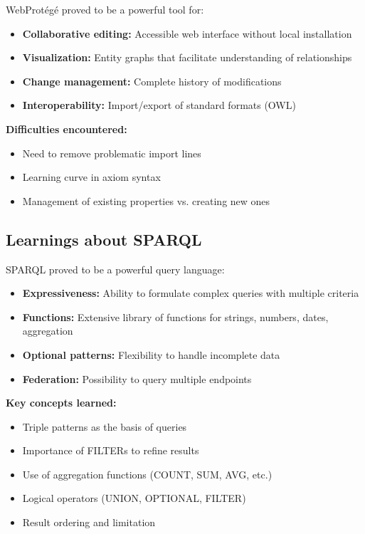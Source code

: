 \documentclass[12pt,a4paper]{article}
\begin{document}
WebProtégé proved to be a powerful tool for:

\begin{itemize}
    \item \textbf{Collaborative editing:} Accessible web interface without local installation
    \item \textbf{Visualization:} Entity graphs that facilitate understanding of relationships
    \item \textbf{Change management:} Complete history of modifications
    \item \textbf{Interoperability:} Import/export of standard formats (OWL)
\end{itemize}

\textbf{Difficulties encountered:}
\begin{itemize}
    \item Need to remove problematic import lines
    \item Learning curve in axiom syntax
    \item Management of existing properties vs. creating new ones
\end{itemize}

\subsection{Learnings about SPARQL}

SPARQL proved to be a powerful query language:

\begin{itemize}
    \item \textbf{Expressiveness:} Ability to formulate complex queries with multiple criteria
    \item \textbf{Functions:} Extensive library of functions for strings, numbers, dates, aggregation
    \item \textbf{Optional patterns:} Flexibility to handle incomplete data
    \item \textbf{Federation:} Possibility to query multiple endpoints
\end{itemize}

\textbf{Key concepts learned:}
\begin{itemize}
    \item Triple patterns as the basis of queries
    \item Importance of FILTERs to refine results
    \item Use of aggregation functions (COUNT, SUM, AVG, etc.)
    \item Logical operators (UNION, OPTIONAL, FILTER)
    \item Result ordering and limitation
\end{itemize}
\end{document}
